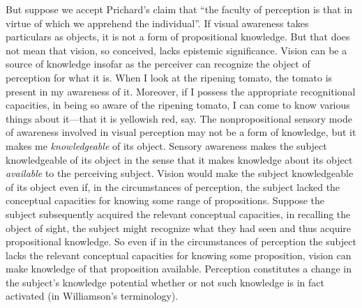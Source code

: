 \documentclass[12pt]{article}
\begin{document}
But suppose we accept Prichard's claim that ``the faculty of perception is that in virtue of which we apprehend the individual''. If visual awareness takes particulars as objects, it is not a form of propositional knowledge. But that does not mean that vision, so conceived, lacks epistemic significance. Vision can be a source of knowledge insofar as the perceiver can recognize the object of perception for what it is. When I look at the ripening tomato, the tomato is present in my awareness of it. Moreover, if I possess the appropriate recognitional capacities, in being so aware of the ripening tomato, I can come to know various things about it---that it is yellowish red, say. The nonpropositional sensory mode of awareness involved in visual perception may not be a form of knowledge, but it makes me \emph{knowledgeable} of its object. Sensory awareness makes the subject knowledgeable of its object in the sense that it makes knowledge about its object \emph{available} to the perceiving subject. Vision would make the subject knowledgeable of its object even if, in the circumstances of perception, the subject lacked the conceptual capacities for knowing some range of propositions. Suppose the subject subsequently acquired the relevant conceptual capacities, in recalling the object of sight, the subject might recognize what they had seen and thus acquire propositional knowledge. So even if in the circumstances of perception the subject lacks the relevant conceptual capacities for knowing some proposition, vision can make knowledge of that proposition available. Perception constitutes a change in the subject's knowledge potential whether or not such knowledge is in fact activated (in Williamson's \citeyear{Williamson:1990uq} terminology).
\end{document}
